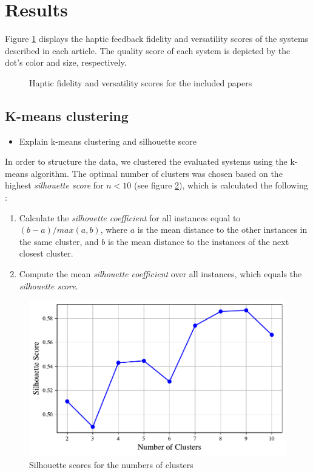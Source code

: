 \twocolumn

\section{Results}
\label{sec:results}
Figure \ref{fig:fidelity_plot} displays the haptic feedback fidelity and versatility scores of the systems described in each article. The quality score of each system is depicted by the dot's color and size, respectively.

\begin{figure}[htbp]
    
    \caption{Haptic fidelity and versatility scores for the included papers}
    \label{fig:fidelity_plot}
\end{figure}

\subsection{K-means clustering}
\begin{itemize}
    \item Explain k-means clustering and silhouette score
\end{itemize}

In order to structure the data, we clustered the evaluated systems using the k-means algorithm. The optimal number of clusters was chosen based on the highest \textit{silhouette score} for $n<10$ (see figure \ref{fig:silhouette}), which is calculated the following \cite{Rousseeuw1987Silhouettes:Analysis}:
\begin{enumerate}
    \item Calculate the \textit{silhouette coefficient} for all instances equal to $(b-a) / max(a,b)$, where $a$ is the mean distance to the other instances in the same cluster, and $b$ is the mean distance to the instances of the next closest cluster.
    \item Compute the mean \textit{silhouette coefficient} over all instances, which equals the \textit{silhouette score}.
\end{enumerate}

\begin{figure}[htbp]
    \centering
    \includegraphics[width=\columnwidth]{figures/silhouette.pdf} 
    \caption{Silhouette scores for the numbers of clusters}
    \label{fig:silhouette}
\end{figure}

